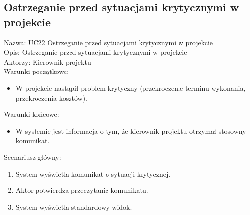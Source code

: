 \subsection{Ostrzeganie przed sytuacjami krytycznymi w projekcie}
Nazwa: UC22 Ostrzeganie przed sytuacjami krytycznymi w projekcie \\
Opis: Ostrzeganie przed sytuacjami krytycznymi w projekcie \\
Aktorzy: Kierownik projektu \\
Warunki początkowe:
\begin{itemize}
\item W projekcie nastąpił problem krytyczny (przekroczenie terminu wykonania, przekroczenia kosztów).
\end{itemize}
Warunki końcowe:
\begin{itemize}
\item W systemie jest informacja o tym, że kierownik projektu otrzymał stosowny komunikat.
\end{itemize}
Scenariusz główny:
\begin{enumerate}
\item System wyświetla komunikat o sytuacji krytycznej.
\item Aktor potwierdza przeczytanie komunikatu.
\item System wyświetla standardowy widok.
\end{enumerate}

